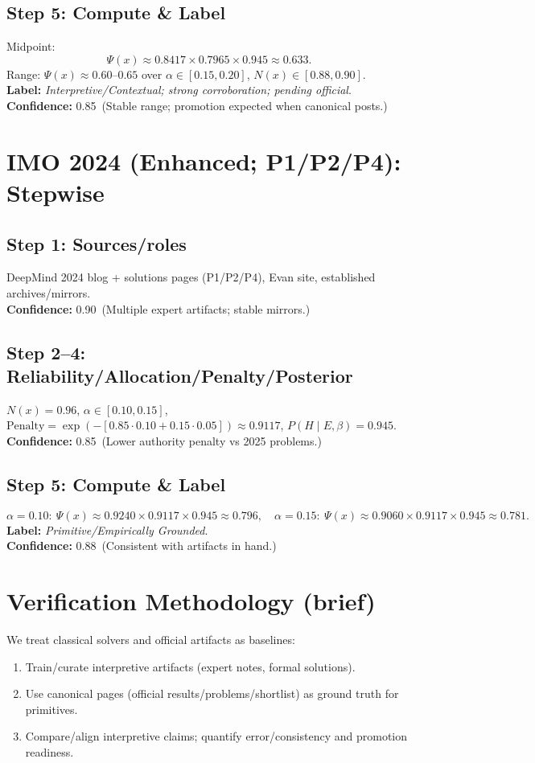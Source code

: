 \documentclass[11pt]{article}
\newcommand{\Nx}{N(x)}
\newcommand{\Px}{\Psi(x)}
\newcommand{\post}{P(H\mid E,\beta)}
\newcommand{\pen}{\mathrm{Penalty}}
\newcommand{\conf}[2]{\textbf{Confidence:} #1\ (#2)}
\begin{document}
\subsection*{Step 5: Compute \& Label}
Midpoint:
\[
\Px \approx 0.8417 \times 0.7965 \times 0.945 \approx 0.633.
\]
Range: $\Px\approx 0.60$--$0.65$ over $\alpha\in[0.15,0.20]$, $\Nx\in[0.88,0.90]$.\\
\textbf{Label:} \emph{Interpretive/Contextual; strong corroboration; pending official}.\\
\conf{0.85}{Stable range; promotion expected when canonical posts.}

\section{IMO 2024 (Enhanced; P1/P2/P4): Stepwise}
\subsection*{Step 1: Sources/roles}
DeepMind 2024 blog + solutions pages (P1/P2/P4), Evan site, established archives/mirrors.\\
\conf{0.90}{Multiple expert artifacts; stable mirrors.}

\subsection*{Step 2--4: Reliability/Allocation/Penalty/Posterior}
$\Nx=0.96$, $\alpha\in[0.10,0.15]$, $\pen=\exp(-[0.85\cdot 0.10+0.15\cdot 0.05])\approx 0.9117$, $\post=0.945$.\\
\conf{0.85}{Lower authority penalty vs 2025 problems.}

\subsection*{Step 5: Compute \& Label}
\[
\alpha=0.10:\ \Px \approx 0.9240\times 0.9117\times 0.945 \approx 0.796,\quad
\alpha=0.15:\ \Px \approx 0.9060\times 0.9117\times 0.945 \approx 0.781.
\]
\textbf{Label:} \emph{Primitive/Empirically Grounded}.\\
\conf{0.88}{Consistent with artifacts in hand.}

\section{Verification Methodology (brief)}
We treat classical solvers and official artifacts as baselines:
\begin{enumerate}[leftmargin=1.35em]
  \item Train/curate interpretive artifacts (expert notes, formal solutions).
  \item Use canonical pages (official results/problems/shortlist) as ground truth for primitives.
  \item Compare/align interpretive claims; quantify error/consistency and promotion readiness.
\end{enumerate}
\end{document}
